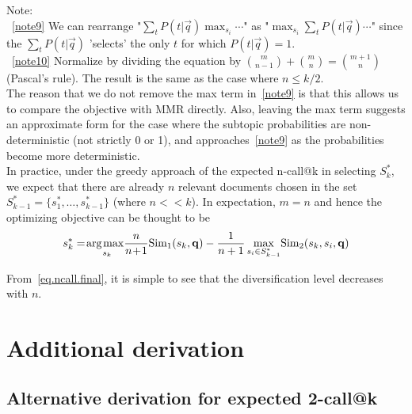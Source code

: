 \noindent
Note: \\
~\eqref{note9} We can rearrange "$\sum_t P(t|\vec{q}) \max_{s_i} \cdots$" as "$\max_{s_i} \sum_t P(t|\vec{q}) \cdots$" since the $\sum_t P(t|\vec{q})$ 'selects' the only $t$ for which $P(t|\vec{q}) = 1$. \\
~\eqref{note10} Normalize by dividing the equation by $\binom{m}{n-1} + \binom{m}{n} = \binom{m+1}{n}$ (Pascal's rule).
The result is the same as the case where $n \leq k/2$. \\

The reason that we do not remove the max term in~\eqref{note9} is that this allows us to compare the objective with MMR directly. Also, leaving the max term suggests an approximate form for the case where the subtopic probabilities are non-deterministic (not strictly 0 or 1), and approaches~\eqref{note9} as the probabilities become more deterministic. \\

In practice, under the greedy approach of the expected n-call@k in selecting $S_k^*$, we expect that there are already $n$ relevant documents chosen in the set $S_{k-1}^* = \{s_1^*, \dots, s_{k-1}^*\}$ (where $n << k$). In expectation, $m = n$ and hence the optimizing objective can be thought to be
\begin{align}
 s_k^* = \argmax_{s_k} \!\! \frac{n}{n\!+\!1} \Sim_1(s_k,\vec{q}) - \frac{1}{n+1} \max_{s_i \in S_{k-1}^*} \! \Sim_2(s_k,s_i,\vec{q}) \label{eq.ncall.final}
\end{align} 

From~\eqref{eq.ncall.final}, it is simple to see that the diversification level decreases with $n$.

\section{Additional derivation}
\subsection{Alternative derivation for expected 2-call@k}

